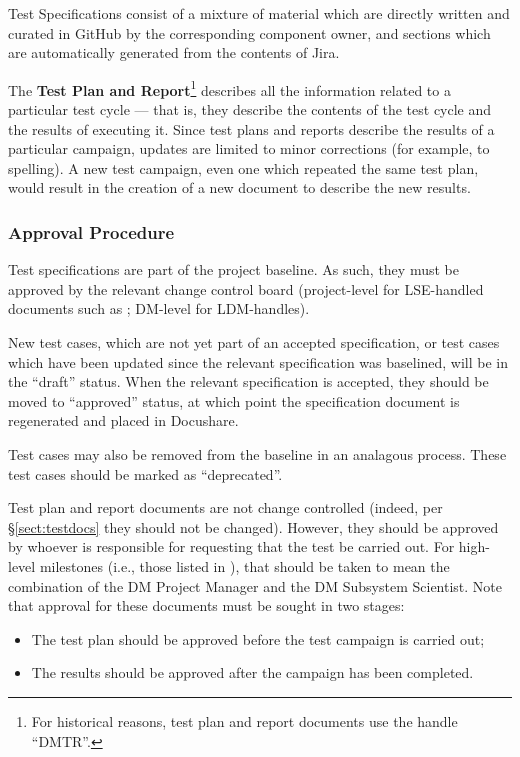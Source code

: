 Test Specifications consist of a mixture of material which are directly written and curated in GitHub by the corresponding component owner, and sections which are automatically generated from the contents of Jira.

The \textbf{Test Plan and Report}\footnote{For historical reasons, test plan and report documents use the handle ``DMTR''.}  describes all the information related to a particular test cycle --- that is, they describe the contents of the test cycle and the results of executing it.
Since test plans and reports describe the results of a particular campaign, updates are limited to minor corrections (for example, to spelling).
A new test campaign, even one which repeated the same test plan, would result in the creation of a new document to describe the new results.

\subsubsection{Approval Procedure}

Test specifications are part of the project baseline.
As such, they must be approved by the relevant change control board (project-level for LSE-handled documents such as ; DM-level for LDM-handles).

New test cases, which are not yet part of an accepted specification, or test cases which have been updated since the relevant specification was baselined, will be in the ``draft'' status.
When the relevant specification is accepted, they should be moved to ``approved'' status, at which point the specification document is regenerated and placed in Docushare.

Test cases may also be removed from the baseline in an analagous process.
These test cases should be marked as ``deprecated''.

Test plan and report documents are not change controlled (indeed, per \S\ref{sect:testdocs} they should not be changed).
However, they should be approved by whoever is responsible for requesting that the test be carried out.
For high-level milestones (i.e., those listed in ), that should be taken to mean the combination of the DM Project Manager and the DM Subsystem Scientist.
Note that approval for these documents must be sought in two stages:

\begin{itemize}

  \item{The test plan should be approved before the test campaign is carried out;}
  \item{The results should be approved after the campaign has been completed.}

\end{itemize}

